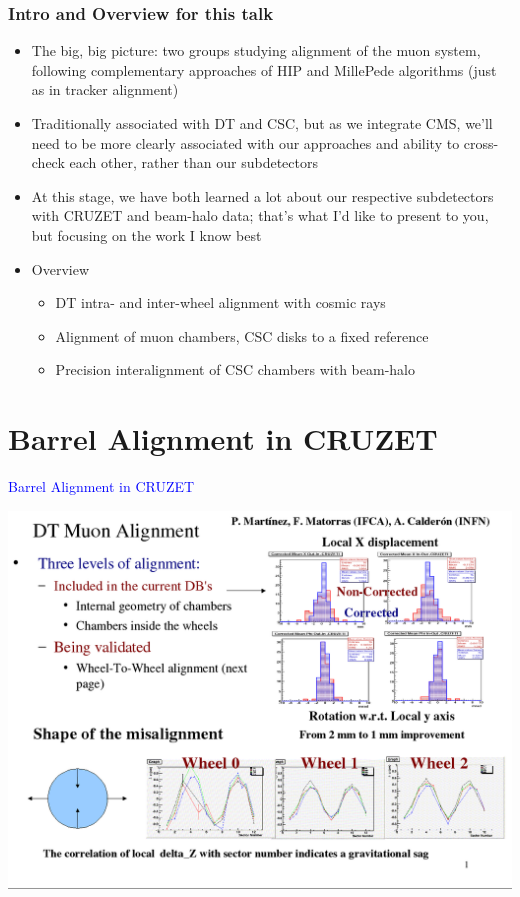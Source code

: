 \documentclass[compress]{beamer}
\begin{document}
\begin{frame}
\small
\frametitle{Intro and Overview for this talk}
\begin{itemize}\setlength{\itemsep}{0.4 cm}
\item The big, big picture: two groups studying alignment of the muon system, following complementary approaches of HIP and MillePede algorithms (just as in tracker alignment)
\item Traditionally associated with DT and CSC, but as we integrate CMS, we'll need to be more clearly associated with our approaches and ability to cross-check each other, rather than our subdetectors
\item At this stage, we have both learned a lot about our respective subdetectors with CRUZET and beam-halo data; that's what I'd like to present to you, but focusing on the work I know best
\item Overview

\begin{itemize}\setlength{\itemsep}{0.2 cm}
\item DT intra- and inter-wheel alignment with cosmic rays
\item Alignment of muon chambers, CSC disks to a fixed reference
\item Precision interalignment of CSC chambers with beam-halo
\end{itemize}
\end{itemize}
\end{frame}

\section*{Barrel Alignment in CRUZET}
\begin{frame}
\begin{center}
\Huge \textcolor{blue}{Barrel Alignment in CRUZET}
\end{center}
\end{frame}

\begin{frame}
\mbox{\hspace{-1 cm}\includegraphics[width=1.2\linewidth]{Pablo1.png}}
\end{frame}
\end{document}
